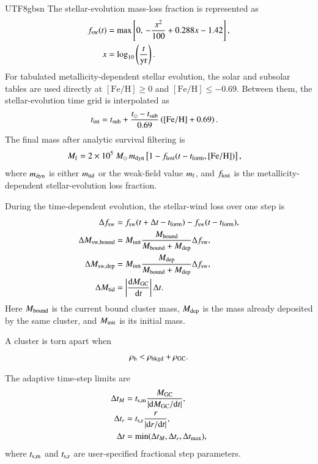 \documentclass[trackchanges, twocolappendix, twocolumn]{aastex701}
\begin{document}
\begin{CJK*}{UTF8}{gbsn}
The stellar-evolution mass-loss fraction is represented as
\begin{align}
f_{\rm sw}(t) &=
\max\left[0,\,-\dfrac{x^2}{100}+0.288x-1.42\right],\\
x &= \log_{10}\left(\dfrac{t}{\rm yr}\right).
\end{align}
For tabulated metallicity-dependent stellar evolution, the solar and subsolar tables are used directly at $[\mathrm{Fe}/\mathrm{H}]\geq0$ and $[\mathrm{Fe}/\mathrm{H}]\leq -0.69$. Between them, the stellar-evolution time grid is interpolated as
\begin{align}
t_{\rm int} &=
t_{\rm sub}
+\dfrac{t_{\odot}-t_{\rm sub}}{0.69}
\left([\mathrm{Fe}/\mathrm{H}]+0.69\right).
\end{align}
The final mass after analytic survival filtering is
\begin{align}
M_{\rm f} &=
2\times10^5~M_\odot\,m_{\rm dyn}
\left[1-f_{\rm lost}(t-t_{\rm form},[\mathrm{Fe}/\mathrm{H}])\right],
\end{align}
where $m_{\rm dyn}$ is either $m_{\rm tid}$ or the weak-field value $m_{\rm f}$, and $f_{\rm lost}$ is the metallicity-dependent stellar-evolution loss fraction.

During the time-dependent evolution, the stellar-wind loss over one step is
\begin{align}
\Delta f_{\rm sw} &=
f_{\rm sw}(t+\Delta t-t_{\rm form})
-f_{\rm sw}(t-t_{\rm form}),\\
\Delta M_{\rm sw,bound} &=
M_{\rm init}\dfrac{M_{\rm bound}}
{M_{\rm bound}+M_{\rm dep}}\Delta f_{\rm sw},\\
\Delta M_{\rm sw,dep} &=
M_{\rm init}\dfrac{M_{\rm dep}}
{M_{\rm bound}+M_{\rm dep}}\Delta f_{\rm sw},\\
\Delta M_{\rm tid} &=
\left|\dfrac{\mathrm{d}M_{\rm GC}}{\mathrm{d}t}\right|\Delta t.
\end{align}
Here $M_{\rm bound}$ is the current bound cluster mass, $M_{\rm dep}$ is the mass already deposited by the same cluster, and $M_{\rm init}$ is its initial mass.

A cluster is torn apart when
\begin{align}
\rho_{\rm h} < \rho_{\rm bkgd}+\rho_{\rm GC} .
\end{align}

The adaptive time-step limits are
\begin{align}
\Delta t_M &= t_{\rm s,m}\dfrac{M_{\rm GC}}{|\mathrm{d}M_{\rm GC}/\mathrm{d}t|},\\
\Delta t_r &= t_{\rm s,r}\dfrac{r}{|\mathrm{d}r/\mathrm{d}t|},\\
\Delta t &= \min(\Delta t_M,\Delta t_r,\Delta t_{\max}),
\end{align}
where $t_{\rm s,m}$ and $t_{\rm s,r}$ are user-specified fractional step parameters.


\end{CJK*}
\end{document}
